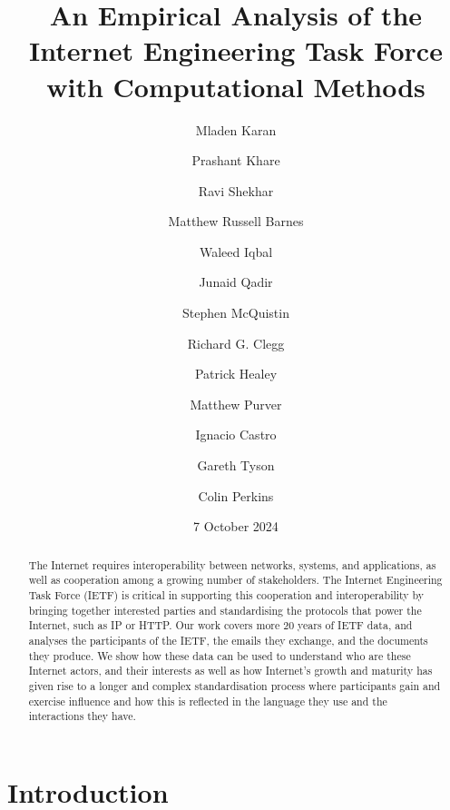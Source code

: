 \documentclass[twocolumn,10pt]{article}
\begin{document}
\title{An Empirical Analysis of the Internet Engineering Task Force with Computational Methods}

\author[1]{Mladen Karan}
\author[1]{Prashant Khare}
\author[2]{Ravi Shekhar}
\author[1]{Matthew Russell Barnes}
\author[1]{Waleed Iqbal}
\author[3]{Junaid Qadir}
\author[4]{Stephen McQuistin}
\author[1]{Richard G. Clegg}
\author[1]{Patrick Healey}
\author[5]{Matthew Purver}
\author[1]{Ignacio Castro}
\author[6]{Gareth Tyson}
\author[7]{Colin Perkins}


\date{7 October 2024}

\maketitle
\begin{abstract}

  The Internet requires interoperability between networks, systems, and
  applications, as well as cooperation among a growing number of
  stakeholders. The Internet Engineering Task Force (IETF) is critical in
  supporting this cooperation and interoperability by bringing together
  interested parties and standardising the protocols that power the
  Internet, such as IP or HTTP. Our work covers more 20 years of IETF
  data, and analyses the participants of the IETF, the emails they
  exchange, and the documents they produce. We show how these data can be
  used to understand who are these Internet actors, and their interests as
  well as how Internet's growth and maturity has given rise to a longer and
  complex standardisation process where participants gain and exercise
  influence and how this is reflected in the language they use and the
  interactions they have.
  
\end{abstract}
\section{Introduction}
\end{document}
